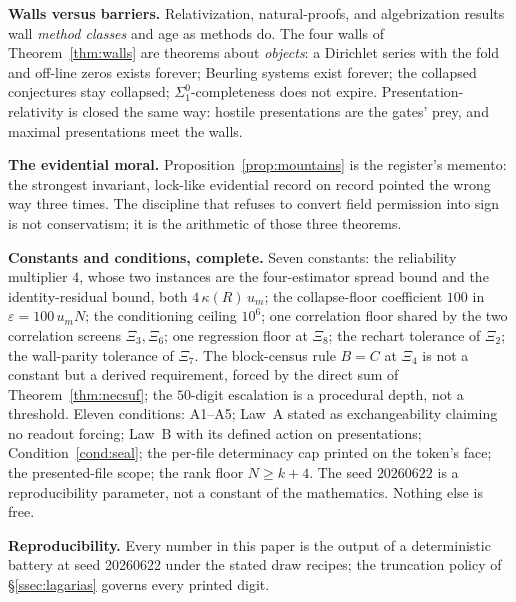 \documentclass[twocolumn,10pt]{article}
\theoremstyle{plain}
\theoremstyle{definition}
\begin{document}
\textbf{Walls versus barriers.} Relativization, natural-proofs, and algebrization results wall \emph{method classes} and age as methods do. The four walls of Theorem~\ref{thm:walls} are theorems about \emph{objects}: a Dirichlet series with the fold and off-line zeros exists forever; Beurling systems exist forever; the collapsed conjectures stay collapsed; $\Sigma^0_1$-completeness does not expire. Presentation-relativity is closed the same way: hostile presentations are the gates' prey, and maximal presentations meet the walls.

\textbf{The evidential moral.} Proposition~\ref{prop:mountains} is the register's memento: the strongest invariant, lock-like evidential record on record pointed the wrong way three times. The discipline that refuses to convert field permission into sign is not conservatism; it is the arithmetic of those three theorems.

\textbf{Constants and conditions, complete.} Seven constants: the reliability multiplier $4$, whose two instances are the four-estimator spread bound and the identity-residual bound, both $4\,\kappa(R)\,u_m$; the collapse-floor coefficient $100$ in $\varepsilon=100\,u_m N$; the conditioning ceiling $10^6$; one correlation floor shared by the two correlation screens $\Xi_3,\Xi_6$; one regression floor at $\Xi_8$; the rechart tolerance of $\Xi_2$; the wall-parity tolerance of $\Xi_7$. The block-census rule $B=C$ at $\Xi_4$ is not a constant but a derived requirement, forced by the direct sum of Theorem~\ref{thm:necsuf}; the $50$-digit escalation is a procedural depth, not a threshold. Eleven conditions: A1--A5; Law~A stated as exchangeability claiming no readout forcing; Law~B with its defined action on presentations; Condition~\ref{cond:seal}; the per-file determinacy cap printed on the token's face; the presented-file scope; the rank floor $N\ge k+4$. The seed $20260622$ is a reproducibility parameter, not a constant of the mathematics. Nothing else is free.

\textbf{Reproducibility.} Every number in this paper is the output of a deterministic battery at seed 20260622 under the stated draw recipes; the truncation policy of \S\ref{ssec:lagarias} governs every printed digit.
\end{document}
